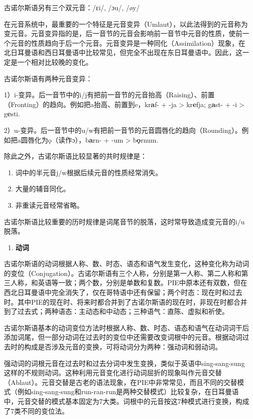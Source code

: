 古诺尔斯语另有三个双元音：/ɛi/, /ɔu/, /øy/

在元音系统中，最重要的一个特征是元音变异（Umlaut），以此法得到的元音称为变元音。元音变异指的是，后一音节的元音会影响前一音节中元音的性质，使前一个元音的性质趋向于后一个元音。元音变异是一种同化（Assimilation）现象，在北日耳曼语和西日耳曼语中比较常见，但完全不出现在东日耳曼语中。因此，这一定是一个相对比较晚的变化。

古诺尔斯语有两种元音变异：

1）i-变异。后一音节中的i/j有把前一音节的元音抬高（Raising）、前置（Fronting）的趋向。例如把a抬高、前置到e，kr\textbf{a}f-
+ -ja \textgreater{} kr\textbf{e}fja; g\textbf{a}st- + -i \textgreater{}
g\textbf{e}sti.

2）u-变异。后一音节中的u/w有把前一音节的元音圆唇化的趋向（Rounding）。例如把a圆唇化为ǫ（读作ɔ），b\textbf{a}rn-
+ -um \textgreater{} b\textbf{ǫ}rnum.

除此之外，古诺尔斯语比较显著的共时规律是：

\begin{enumerate}
\def\labelenumi{\arabic{enumi}.}
\item
  词中的半元音j/w根据后续元音的性质经常消失。
\item
  大量的辅音同化。
\item
  非重读元音经常省略。
\end{enumerate}

古诺尔斯语比较重要的历时规律是词尾音节的脱落，这时常导致造成变元音的i/u脱落。

\begin{enumerate}
\def\labelenumi{\Alph{enumi}.}
\setcounter{enumi}{1}
\item
  \textbf{动词}
\end{enumerate}

古诺尔斯语的动词根据人称、数、时态、语态和语气发生变化，这种变化称为动词的变位（Conjugation）。古诺尔斯语有三个人称，分别是第一人称、第二人称和第三人称，和英语等一致；两个数，分别是单数和复数。PIE中原本还有双数，但在西北日耳曼语中完全消失了，仅在哥特语中还有保留；两个时态：现在时和过去时。其中PIE的现在时、将来时都合并到了古诺尔斯语的现在时，非现在时都合并到了过去式；两种语态：主动态和中动态；三种语气：直陈、虚拟和祈使。

古诺尔斯语基本的动词变位方法时根据人称、数、时态、语态和语气在动词词干后添加词尾，但一部分动词在过去时的变位中还需要改变词根中的元音。根据动词过去时的构成是否涉及元音的变换，可将动词分为两种：强动词和弱动词。

强动词的词根元音在过去时和过去分词中发生变换，类似于英语中sing-sang-sung这样的不规则动词。这种利用元音变化进行动词屈折的现象叫作元音交替（Ablaut）。元音交替是古老的语法现象，在PIE中非常常见，而且不同的交替模式（例如sing-sang-sung和run-ran-run是两种交替模式）比较复杂，在日耳曼语中，元音交替的模式基本固定为7大类。词根中的元音按这7种模式进行变换，构成了7类不同的变位法。

